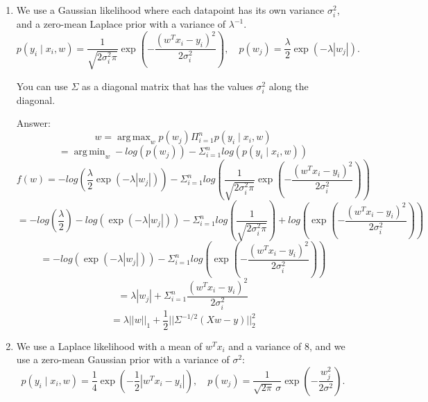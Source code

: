 \documentclass{article}
\newenvironment{answer}{\par\begingroup\color{gre}Answer: }{\endgroup}
\begin{document}
\begin{enumerate}

\item We use a Gaussian likelihood where each datapoint has its own variance $\sigma_i^2$, and a zero-mean Laplace prior with a variance of $\lambda^{-1}$.
\[
p(y_i \mid x_i,w) = \frac{1}{\sqrt{2\sigma_i^2\pi}}\exp\left(-\frac{(w^Tx_i - y_i)^2}{2\sigma_i^2}\right), \quad p(w_j) = \frac{\lambda}{2}\exp(-\lambda|w_j|).
\]

You can use $\Sigma$ as a diagonal matrix that has the values $\sigma_i^2$ along the diagonal.
\begin{answer}
    \[
    w = \mathop{\mathrm{arg\,max}}_w p(w_j)\Pi^n_{i=1}p(y_i \mid x_i,w)
    \]
    \[
    = \mathop{\mathrm{arg\,min}}_w -log(p(w_j))-\Sigma^n_{i=1}log(p(y_i \mid x_i,w))
    \]
    \[
    f(w) = -log(\frac{\lambda}{2}\exp(-\lambda|w_j|))-\Sigma^n_{i=1}log(\frac{1}{\sqrt{2\sigma_i^2\pi}}\exp\left(-\frac{(w^Tx_i - y_i)^2}{2\sigma_i^2}\right)) 
    \]
    \[
    = -log(\frac{\lambda}{2})-log(\exp(-\lambda|w_j|))-\Sigma^n_{i=1}log(\frac{1}{\sqrt{2\sigma_i^2\pi}})+log(\exp\left(-\frac{(w^Tx_i - y_i)^2}{2\sigma_i^2}\right))
    \]
    \[
    = -log(\exp(-\lambda|w_j|))-\Sigma^n_{i=1}log(\exp\left(-\frac{(w^Tx_i - y_i)^2}{2\sigma_i^2}\right))
    \]
    \[
    = \lambda|w_j|+\Sigma^n_{i=1}\frac{(w^Tx_i - y_i)^2}{2\sigma_i^2}
    \]
    \[
    = \lambda||w||_1+\frac{1}{2}||\Sigma^{-1/2}(Xw-y)||^2_2
    \]
\end{answer}

\newpage

\item We use a Laplace likelihood with a mean of $w^Tx_i$ and a variance of $8$, and we use a zero-mean Gaussian prior with a variance of $\sigma^2$:
\[
p(y_i \mid x_i, w) = \frac14 \exp\left(- \frac12 |w^Tx_i - y_i| \right), \quad
p(w_j) = \frac{1}{\sqrt{2\pi} \, \sigma} \exp\left(-\frac{w_j^2}{2\sigma^2} \right).
\]


\end{enumerate}
\end{document}
